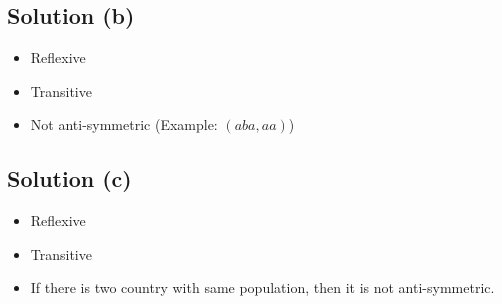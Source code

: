 \documentclass{article}
\begin{document}
\subsection{Solution (b)}
\begin{itemize}
\item Reflexive
\item Transitive
\item Not anti-symmetric (Example: $(aba, aa)$)
\end{itemize}

\subsection{Solution (c)}
\begin{itemize}
\item Reflexive
\item Transitive
\item If there is two country with same population, then it is not anti-symmetric.
\end{itemize}
\end{document}
